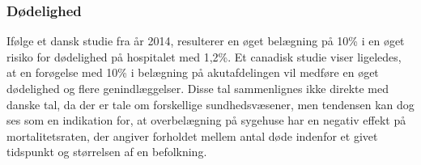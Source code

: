\subsubsection{Dødelighed}
Ifølge et dansk studie fra år 2014, resulterer en øget belægning på 10\% i en øget risiko for dødelighed på hospitalet med 1,2\%. \citep{Madsen2014}  Et canadisk studie viser ligeledes, at en forøgelse med 10\% i belægning på akutafdelingen vil medføre en øget dødelighed og flere genindlæggelser.\citep{McCusker2014} Disse tal sammenlignes ikke direkte med danske tal, da der er tale om forskellige sundhedsvæsener, men tendensen kan dog ses som en indikation for, at overbelægning på sygehuse har en negativ effekt på mortalitetsraten, der angiver forholdet mellem antal døde indenfor et givet tidspunkt og størrelsen af en befolkning. \citep{denstoredanskeordbog2}  